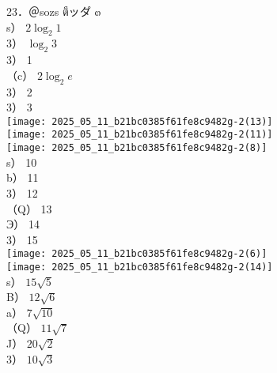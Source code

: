 \documentclass[10pt]{article}
\begin{document}
23．＠sozs ตึッタ゚ ๓\\
s） $2 \log _{2} 1$\\
3） $\log _{2} 3$\\
3） 1\\
（c） $2 \log _{2} e$\\
3） 2\\
3） 3\\
\texttt{[image: 2025\_05\_11\_b21bc0385f61fe8c9482g-2(13)]}\\
\texttt{[image: 2025\_05\_11\_b21bc0385f61fe8c9482g-2(11)]}\\
\texttt{[image: 2025\_05\_11\_b21bc0385f61fe8c9482g-2(8)]}\\
s） 10\\
b） 11\\
3） 12\\
（Q） 13\\
Э） 14\\
3） 15\\
\texttt{[image: 2025\_05\_11\_b21bc0385f61fe8c9482g-2(6)]}\\
\texttt{[image: 2025\_05\_11\_b21bc0385f61fe8c9482g-2(14)]}\\
s） $15 \sqrt{5}$\\
B） $12 \sqrt{6}$\\
a） $7 \sqrt{10}$\\
（Q） $11 \sqrt{7}$\\
J） $20 \sqrt{2}$\\
3） $10 \sqrt{3}$
\end{document}

